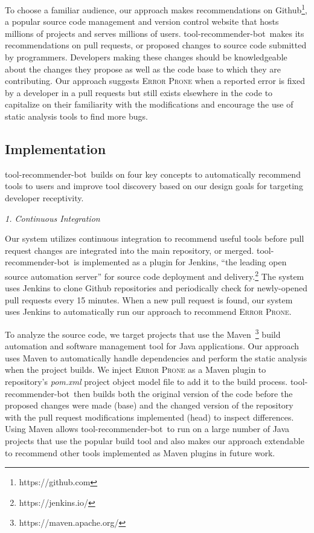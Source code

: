\documentclass[conference]{IEEEtran}
\newcommand{\tool}{tool-recommender-bot}
\newcommand{\pseudosubsection}[1]{\vspace{2mm} {\it #1}}
\begin{document}
To choose a familiar audience, our approach makes recommendations on Github\footnote{https://github.com}, a popular source code management and version control website that hosts millions of projects and serves millions of users. \tool~makes its recommendations on pull requests, or proposed changes to source code submitted by programmers. Developers making these changes should be knowledgeable about the changes they propose as well as the code base to which they are contributing. Our approach suggests \textsc{Error Prone} when a reported error is fixed by a developer in a pull requests but still exists elsewhere in the code to capitalize on their familiarity with the modifications and encourage the use of static analysis tools to find more bugs. 

\subsection{Implementation}

\tool~builds on four key concepts to automatically recommend tools to users and improve tool discovery based on our design goals for targeting developer receptivity.

\pseudosubsection{1. Continuous Integration}

Our system utilizes continuous integration to recommend useful tools before pull request changes are integrated into the main repository, or merged. \tool~is implemented as a plugin for Jenkins, ``the leading open source automation server'' for source code deployment and delivery.\footnote{https://jenkins.io/} The system uses Jenkins to clone Github repositories and periodically check for newly-opened pull requests every 15 minutes. When a new pull request is found, our system uses Jenkins to automatically run our approach to recommend \textsc{Error Prone}.

To analyze the source code, we target projects that use the Maven~\footnote{https://maven.apache.org/} build automation and software management tool for Java applications. Our approach uses Maven to automatically handle dependencies and perform the static analysis when the project builds. We inject \textsc{Error Prone} as a Maven plugin to repository's \textit{pom.xml} project object model file to add it to the build process. \tool~then builds both the original version of the code before the proposed changes were made (base) and the changed version of the repository with the pull request modifications implemented (head) to inspect differences. Using Maven allows \tool~to run on a large number of Java projects that use the popular build tool and also makes our approach extendable to recommend other tools implemented as Maven plugins in future work. 
\end{document}
